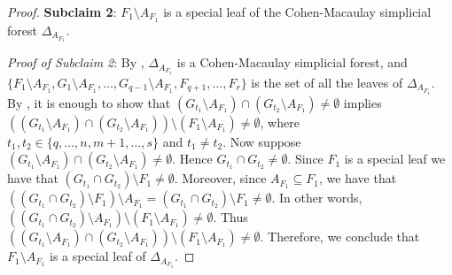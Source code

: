 \documentclass[12pt,a4paper,reqno]{amsart}
\theoremstyle{definition}
\def\D{\Delta}
\begin{document}
\begin{proof}
  \noindent
\textbf{Subclaim 2}: $F_1\setminus A_{F_1}$ is a special leaf of the Cohen-Macaulay simplicial forest $\Delta_{A_{F_1}}$.

\noindent
\textit{Proof of Subclaim 2}: By , $\D_{A_{F_1}}$ is a Cohen-Macaulay simplicial forest, and $\{F_1\setminus A_{F_1},G_1\setminus A_{F_1},\ldots,G_{q-1}\setminus A_{F_1},F_{q+1},\ldots,F_r\}$ is the set of all the leaves of $\Delta_{A_{F_1}}$. By , it is enough to show that $(G_{t_1}\setminus A_{F_1})\cap(G_{t_2}\setminus A_{F_1})\neq\emptyset$ implies $((G_{t_1}\setminus A_{F_1})\cap(G_{t_2}\setminus A_{F_1}))\setminus (F_1\setminus A_{F_1})\neq\emptyset$, where $t_1,t_2\in \{q,\ldots,n,m+1,\ldots,s\}$ and $t_1\neq t_2$. Now suppose $(G_{t_1}\setminus A_{F_1})\cap(G_{t_2}\setminus A_{F_1})\neq\emptyset$. Hence $G_{t_1}\cap G_{t_2}\neq \emptyset$. Since $F_1$ is a special leaf we have that $(G_{t_1}\cap G_{t_2})\setminus F_1\neq\emptyset$. Moreover, since $A_{F_1}\subseteq F_1$, we have that $((G_{t_1}\cap G_{t_2})\setminus F_1)\setminus A_{F_1}=(G_{t_1}\cap G_{t_2})\setminus F_1\neq\emptyset$. In other words, $((G_{t_1}\cap G_{t_2})\setminus A_{F_1})\setminus(F_1\setminus A_{F_1})\neq\emptyset$. Thus $((G_{t_1}\setminus A_{F_1})\cap(G_{t_2}\setminus A_{F_1}))\setminus (F_1\setminus A_{F_1})\neq\emptyset$. Therefore, we conclude that $F_1\setminus A_{F_1}$ is a special leaf of $\Delta_{A_{F_1}}$.




\end{proof}
\end{document}
